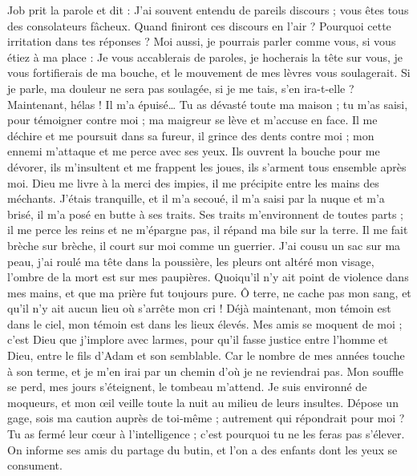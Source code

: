 \begin{multicols}{2}
\VerseOne{}Job prit la parole et dit :
J'ai souvent entendu de pareils discours ; vous êtes tous des consolateurs fâcheux.
Quand finiront ces discours en l'air ? Pourquoi cette irritation dans tes réponses ?
Moi aussi, je pourrais parler comme vous, si vous étiez à ma place : Je vous accablerais de paroles, je hocherais la tête sur vous,
je vous fortifierais de ma bouche, et le mouvement de mes lèvres vous soulagerait.
Si je parle, ma douleur ne sera pas soulagée, si je me tais, s'en ira-t-elle ?
Maintenant, hélas ! Il m'a épuisé… Tu as dévasté toute ma maison ;
tu m'as saisi, pour témoigner contre moi ; ma maigreur se lève et m'accuse en face.
Il me déchire et me poursuit dans sa fureur, il grince des dents contre moi ; mon ennemi m'attaque et me perce avec ses yeux.
Ils ouvrent la bouche pour me dévorer, ils m'insultent et me frappent les joues, ils s'arment tous ensemble après moi.
Dieu me livre à la merci des impies, il me précipite entre les mains des méchants.
J'étais tranquille, et il m'a secoué, il m'a saisi par la nuque et m'a brisé, il m'a posé en butte à ses traits.
Ses traits m'environnent de toutes parts ; il me perce les reins et ne m'épargne pas, il répand ma bile sur la terre.
Il me fait brèche sur brèche, il court sur moi comme un guerrier.
J'ai cousu un sac sur ma peau, j'ai roulé ma tête dans la poussière,
les pleurs ont altéré mon visage, l'ombre de la mort est sur mes paupières.
Quoiqu'il n'y ait point de violence dans mes mains, et que ma prière fut toujours pure.
Ô terre, ne cache pas mon sang, et qu'il n'y ait aucun lieu où s'arrête mon cri !
Déjà maintenant, mon témoin est dans le ciel, mon témoin est dans les lieux élevés.
Mes amis se moquent de moi ; c'est Dieu que j'implore avec larmes,
pour qu'il fasse justice entre l'homme et Dieu, entre le fils d'Adam et son semblable.
Car le nombre de mes années touche à son terme, et je m'en irai par un chemin d'où je ne reviendrai pas.
\VerseOne{}Mon souffle se perd, mes jours s'éteignent, le tombeau m'attend.
Je suis environné de moqueurs, et mon œil veille toute la nuit au milieu de leurs insultes.
Dépose un gage, sois ma caution auprès de toi-même ; autrement qui répondrait pour moi ?
Tu as fermé leur cœur à l'intelligence ; c'est pourquoi tu ne les feras pas s'élever.
On informe ses amis du partage du butin, et l'on a des enfants dont les yeux se consument.

\end{multicols}
